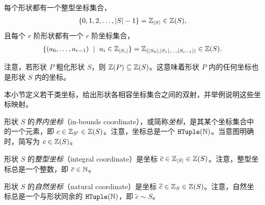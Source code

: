 每个形状都有一个整型坐标集合，
\begin{align*}
\{ 0, 1, 2, \ldots, \left| {S} \right|-1 \} = \mathbb{Z}_{\left| {S} \right|} \in \mathbb{Z}(S),
\end{align*}
且每个 $r$ 阶形状都有一个 $r$ 阶坐标集合，
\begin{align*}
\{ (a_0, \ldots, a_{r-1}) \ \mid \ a_i \in \mathbb{Z}_{\left| {S_i} \right|} \} = \mathbb{Z}_{(\left| {S_0} \right|, \left| {S_1} \right|, \ldots, \left| {S_{r-1}} \right|)} \in \mathbb{Z}(S).
\end{align*}

注意，若形状 $P$ 粗化形状 $S$，则 $\mathbb{Z}(P) \subseteq \mathbb{Z}(S)$。这意味着形状 $P$ 内的任何坐标也是形状 $S$ 内的坐标。







本小节定义若干类坐标，给出形状各相容坐标集合之间的双射，并举例说明这些坐标映射。

\begin{definition}
形状 $S$ 的\emph{界内坐标}（in-bounds coordinate），或简称{\em 坐标}，是其某个坐标集合中的一个元素，即 $c \in \mathbb{Z}_{S'} \in \mathbb{Z}(S)$。注意，坐标总是一个 $\texttt{HTuple}(\mathbb{N})$。当意图明确时，简写为 $c \in \mathbb{Z}(S)$。
\end{definition}

\begin{definition}
形状 $S$ 的\emph{整型坐标}（integral coordinate）是坐标 $\overline{c} \in \mathbb{Z}_{\left| {S} \right|} \in \mathbb{Z}(S)$。注意，整型坐标总是一个整数，即 $\overline{c} \in \mathbb{N}$。
\end{definition}

\begin{definition}
形状 $S$ 的\emph{自然坐标}（natural coordinate）是坐标 $\widetilde{c} \in \mathbb{Z}_S \in \mathbb{Z}(S)$。注意，自然坐标总是一个与形状同余的 $\texttt{HTuple}(\mathbb{N})$，即 $\tilde{c} \sim S$。
\end{definition}

